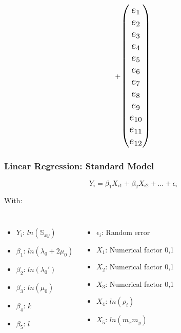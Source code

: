 \documentclass[xcolor=table]{beamer}
\begin{document}
\begin{frame}
\begin{equation}
		+
		\resizebox{!}{.3\textwidth}{$
		\begin{pmatrix}
			e_1 \\
			e_2 \\
			e_3 \\
			e_4 \\
			e_5 \\
			e_6 \\
			e_7 \\
			e_8 \\
			e_9 \\
			e_{10} \\
			e_{11} \\
			e_{12} \\
		\end{pmatrix}$}
	\end{equation}
\end{frame}


\begin{frame}
	\frametitle{Linear Regression: Standard Model}
	
	\begin{equation}
		Y_i = \beta_1 X_{i1} + \beta_2 X_{i2} + ... + \epsilon_i
	\end{equation}

	With:
	
	\begin{columns}[c]
		\begin{itemize}
			\item $Y_i$: $ln(\mathbb{S}_{xy})$
			\item $\beta_1$: $ln(\lambda_{0} + 2\mu_{0})$
			\item $\beta_2$: $ln(\lambda_{0}')$
			\item $\beta_3$: $ln(\mu_{0})$
			\item $\beta_4$: $k$
			\item $\beta_5$: $l$
		\end{itemize}
		\begin{itemize}
			\item $\epsilon_i$: Random error
			\item $X_1$: Numerical factor 0,1
			\item $X_2$: Numerical factor 0,1
			\item $X_3$: Numerical factor 0,1
			\item $X_4$: $ln(\rho_i)$
			\item $X_5$: $ln(m_x m_y)$
		\end{itemize}
	\end{columns}
	
\end{frame}
\end{document}
